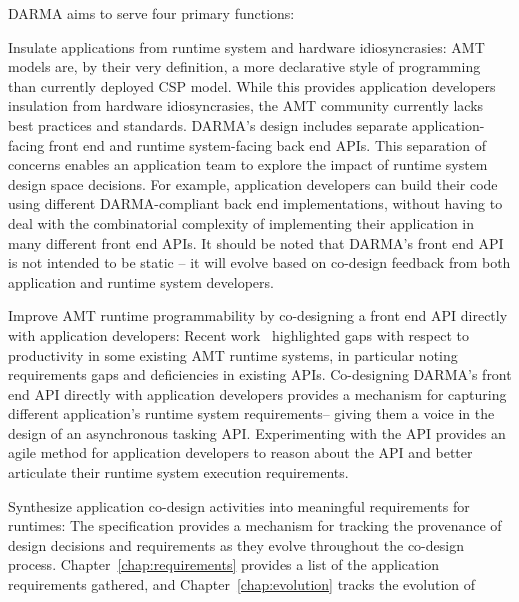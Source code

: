 \gls{DARMA} aims to serve four primary functions:
\begin{compactdesc}
\item[Insulate applications from runtime system and hardware idiosyncrasies:]
  \gls{AMT} models are, by their very definition, a more \gls{declarative} style of
  programming than currently deployed \gls{CSP} model. 
  While this provides application developers insulation from hardware
  idiosyncrasies, the \gls{AMT} community currently lacks best practices and standards.
  \gls{DARMA}'s design includes separate application-facing \gls{front end} and
  \gls{runtime system}-facing \gls{back end} \glspl{API}. This separation of concerns 
  enables an application team to explore the impact of \gls{runtime system}
  design space decisions. For example, application developers can build their code using different
  \gls{DARMA}-compliant \gls{back end} implementations, without
  having to deal with the combinatorial complexity of
  implementing their application in many different \gls{front end} \glspl{API}. 
  It should be noted that \gls{DARMA}'s \gls{front end} \gls{API} is not
  intended to be static  -- it will evolve based on \gls{co-design} feedback from both application
  and \gls{runtime system} developers. 
\item[Improve AMT runtime programmability by co-designing a front end  API directly with application developers:]
  Recent work~\cite{L2Sand2015} highlighted gaps with respect to productivity
  in some existing \gls{AMT} \glspl{runtime system}, in particular noting requirements gaps and 
  deficiencies in existing \glspl{API}. Co-designing \gls{DARMA}'s \gls{front end} \gls{API}
  directly with application developers provides a mechanism for capturing
  different application's \gls{runtime system} requirements-- giving them a voice in the design of an
  asynchronous tasking \gls{API}.  Experimenting with the \gls{API} provides an agile method for application
  developers to reason about the \gls{API} 
  and better articulate their \gls{runtime system} execution requirements.
\item[Synthesize application co-design activities into meaningful requirements
  for runtimes:]
  The specification provides a mechanism for tracking the
  provenance of design decisions and requirements as they evolve throughout the
  \gls{co-design} process. Chapter~\ref{chap:requirements} provides a list of the application
  requirements gathered,  and Chapter~\ref{chap:evolution} tracks the evolution of

\end{compactdesc}
